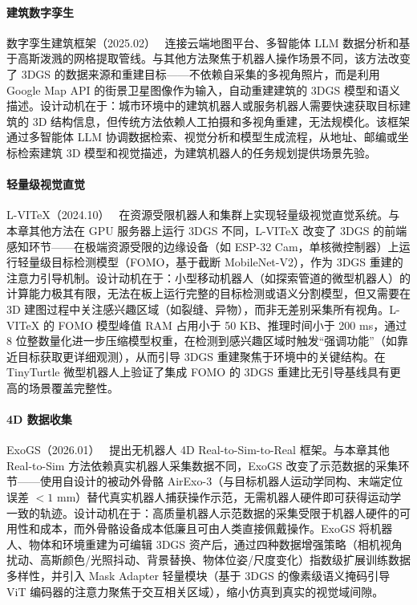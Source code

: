 \paragraph{建筑数字孪生}

数字孪生建筑框架（2025.02）~\cite{2502_05769} 连接云端地图平台、多智能体 LLM 数据分析和基于高斯泼溅的网格提取管线。与其他方法聚焦于机器人操作场景不同，该方法改变了 3DGS 的数据来源和重建目标——不依赖自采集的多视角照片，而是利用 Google Map API 的街景卫星图像作为输入，自动重建建筑的 3DGS 模型和语义描述。设计动机在于：城市环境中的建筑机器人或服务机器人需要快速获取目标建筑的 3D 结构信息，但传统方法依赖人工拍摄和多视角重建，无法规模化。该框架通过多智能体 LLM 协调数据检索、视觉分析和模型生成流程，从地址、邮编或坐标检索建筑 3D 模型和视觉描述，为建筑机器人的任务规划提供场景先验。

\paragraph{轻量级视觉直觉}

L-VITeX（2024.10）~\cite{2410_07872} 在资源受限机器人和集群上实现轻量级视觉直觉系统。与本章其他方法在 GPU 服务器上运行 3DGS 不同，L-VITeX 改变了 3DGS 的前端感知环节——在极端资源受限的边缘设备（如 ESP-32 Cam，单核微控制器）上运行轻量级目标检测模型（FOMO，基于截断 MobileNet-V2），作为 3DGS 重建的注意力引导机制。设计动机在于：小型移动机器人（如探索管道的微型机器人）的计算能力极其有限，无法在板上运行完整的目标检测或语义分割模型，但又需要在 3D 建图过程中关注感兴趣区域（如裂缝、异物），而非无差别采集所有视角。L-VITeX 的 FOMO 模型峰值 RAM 占用小于 50 KB、推理时间小于 200 ms，通过 8 位整数量化进一步压缩模型权重，在检测到感兴趣区域时触发``强调功能''（如靠近目标获取更详细观测），从而引导 3DGS 重建聚焦于环境中的关键结构。在 TinyTurtle 微型机器人上验证了集成 FOMO 的 3DGS 重建比无引导基线具有更高的场景覆盖完整性。

\paragraph{4D 数据收集}

ExoGS（2026.01）~\cite{2601_18629} 提出无机器人 4D Real-to-Sim-to-Real 框架。与本章其他 Real-to-Sim 方法依赖真实机器人采集数据不同，ExoGS 改变了示范数据的采集环节——使用自设计的被动外骨骼 AirExo-3（与目标机器人运动学同构、末端定位误差 $<1$ mm）替代真实机器人捕获操作示范，无需机器人硬件即可获得运动学一致的轨迹。设计动机在于：高质量机器人示范数据的采集受限于机器人硬件的可用性和成本，而外骨骼设备成本低廉且可由人类直接佩戴操作。ExoGS 将机器人、物体和环境重建为可编辑 3DGS 资产后，通过四种数据增强策略（相机视角扰动、高斯颜色/光照抖动、背景替换、物体位姿/尺度变化）指数级扩展训练数据多样性，并引入 Mask Adapter 轻量模块（基于 3DGS 的像素级语义掩码引导 ViT 编码器的注意力聚焦于交互相关区域），缩小仿真到真实的视觉域间隙。

